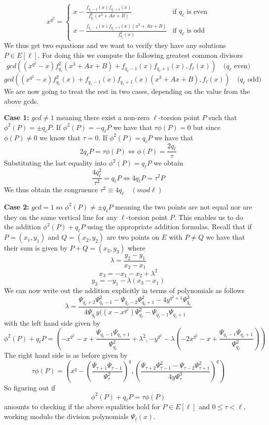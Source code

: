$$
x^{q^2} = \begin{cases}
           x - \frac{f_{q_\ell-1}(x) f_{q_\ell+1}(x)}{f_{q_\ell}^2 (x^3+Ax+B)} & \text{if } q_\ell \text{ is even} \\
	   x - \frac{f_{q_\ell-1}(x) f_{q_\ell+1}(x) (x^3+Ax+B)}{f_{q_\ell}^2(x)} & \text{if } q_\ell \text{ is odd} 
          \end{cases}
$$
We thus get two equations and we want to verify they have any solutions $P \in E[\ell]$. For
doing this we compute the following greatest common divisors
$$ gcd((x^{q^2} - x)f_{q_\ell}^2 (x^3+Ax+B)+f_{q_\ell-1}(x) f_{q_\ell+1}(x), f_\ell(x)) \quad (q_\ell \text{ even)}$$
$$ gcd((x^{q^2} - x)f_{q_\ell}^2(x)+f_{q_\ell-1}(x) f_{q_\ell+1}(x) (x^3+Ax+B), f_\ell(x)) \quad (q_\ell \text{ odd)}$$
We are now going to treat the rest in two cases, depending on the value from the above gcds.

\textbf{Case 1:} $gcd \neq 1$ meaning there exist a non-zero $\ell$-torsion point $P$ such that $\phi^2(P) = \pm q_\ell P$.
If $\phi^2 (P) = -q_\ell P$ we have that $\tau \phi(P) = 0$ but since $\phi(P) \neq 0$ we know that $\tau = 0$.
If $\phi^2(P) = q_\ell P$ we have that 
$$ 2 q_\ell P = \tau \phi(P) \Leftrightarrow \phi(P) = \frac{2 q_\ell}{\tau} $$
Substituting the last equality into $\phi^2(P) = q_\ell P$ we obtain
$$ \frac{4 q_\ell^2}{\tau^2} = q_\ell P \Leftrightarrow 4 q_\ell P = \tau^2 P $$
We thus obtain the congruence $\tau^2 \equiv 4q_\ell \quad (mod \ell)$

\textbf{Case 2:} $gcd = 1$ so $\phi^2(P) \neq \pm q_\ell P$ meaning the two points are 
not equal nor are they on the same vertical line for any $\ell$-torsion point $P$. 
This enables us to do the addition $\phi^2(P) + q_\ell P$ using the appropriate addition formulas.
Recall that if $P = (x_1, y_1)$ and $Q = (x_2, y_2)$ are two points on $E$ with
$P \neq Q$ we have that their sum is given by $P+Q = (x_3, y_3)$ where
$$ \lambda = \frac{y_2 - y_1}{x_2 - x_1} $$
$$ x_3 = -x_1 - x_2 + \lambda^2 $$
$$ y_3 = -y_1 -\lambda(x_3 - x_1) $$
We can now write out the addition explicitly in terms of polynomials as follows
$$ \lambda = \frac{\Psi_{q_\ell+2} \Psi_{q_\ell-1}^2 - \Psi_{q_\ell-2}\Psi_{q_\ell+1}^2 - 4y^{q^2+1}\Psi_{q_\ell}^3}
		  {4\Psi_{q_\ell} y ((x-x^{q^2})\Psi_{q_\ell}^2 - \Psi_{q_\ell-1}\Psi_{q_\ell+1}} $$
with the left hand side given by
$$\phi^2 (P) + q_\ell P = \left(-x^{q^2}-x+\frac{\Psi_{q_\ell-1}\Psi_{q_\ell+1}}{\Psi_{q_\ell}^2}+\lambda^2,
		     -y^{q^2}-\lambda\left(-2x^{q^2}-x+\frac{\Psi_{q_\ell-1}\Psi_{q_\ell+1}}{\Psi_{q_\ell}^2}\right)\right)$$
The right hand side is as before given by
$$ \tau\phi(P)=\left(x^q-\left(\frac{\Psi_{\tau+1}\Psi_{\tau-1}}{\Psi_\tau^2}\right)^q,\left(\frac{\Psi_{\tau+2}\Psi_{\tau-1}^2 - \Psi_{\tau-2}\Psi_{\tau+1}^2}{4y\Psi_\tau^3}\right)^q\right) $$
So figuring out if $$\phi^2(P) + q_\ell P = \tau \phi(P) $$ amounts to checking if the above equalities
hold for $P\in E[\ell]$ and $0 \leq \tau < \ell$, working modulo the division polynomials $\Psi_\ell(x)$. 
